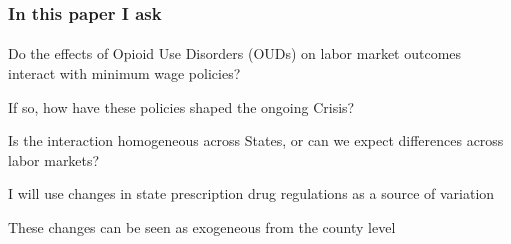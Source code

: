 \begin{frame}

    \frametitle{In this paper I ask} %
    \framesubtitle{}  %
    \rmfamily %
    
    \begin{wideitemize}
        \item Do the effects of \textcolor{fblu}{Opioid Use Disorders} (\textcolor{fblu}{OUDs}) on labor market outcomes interact with minimum wage policies?
        \item If so, how have these policies shaped the ongoing Crisis?
        \item Is the interaction homogeneous across States, or can we expect differences across labor markets?
    \end{wideitemize}

    \vspace{9pt}
    I will use \textcolor{fblu}{changes in state prescription drug regulations} as a source of variation
    \vspace{9pt} 
    
    \begin{wideitemize}
        \item These changes can be seen as \textcolor{fblu}{exogeneous} from the \textcolor{fblu}{county level}
    \end{wideitemize}
    
\end{frame}


